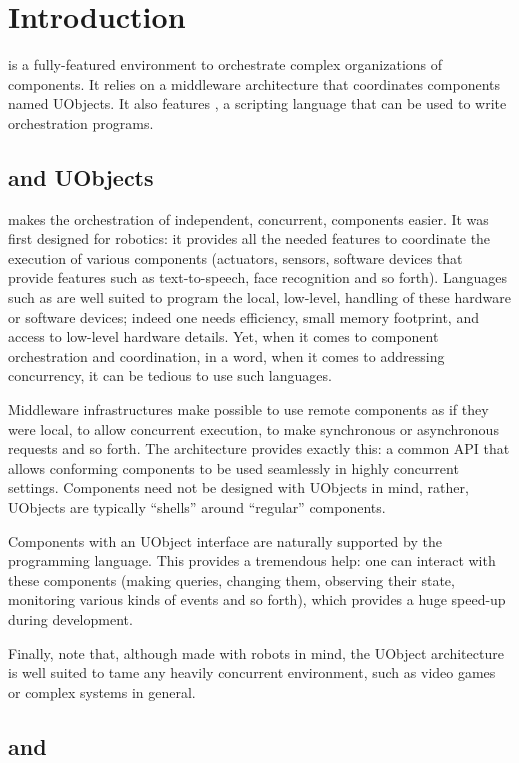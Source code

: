 \chapter{Introduction}

\usdk is a fully-featured environment to orchestrate complex
organizations of components.  It relies on a middleware architecture
that coordinates components named UObjects.  It also features \us, a
scripting language that can be used to write orchestration programs.

\section{\urbi and UObjects}

\urbi makes the orchestration of independent, concurrent, components
easier.  It was first designed for robotics: it provides all the
needed features to coordinate the execution of various components
(actuators, sensors, software devices that provide features such as
text-to-speech, face recognition and so forth).  Languages such as
\Cxx are well suited to program the local, low-level, handling of
these hardware or software devices; indeed one needs efficiency, small
memory footprint, and access to low-level hardware details.  Yet, when
it comes to component orchestration and coordination, in a word, when
it comes to addressing concurrency, it can be tedious to use such
languages.

Middleware infrastructures make possible to use remote components as
if they were local, to allow concurrent execution, to make synchronous
or asynchronous requests and so forth.  The  \Cxx
architecture provides exactly this: a common API that allows
conforming components to be used seamlessly in highly concurrent
settings.  Components need not be designed with UObjects in mind,
rather, UObjects are typically ``shells'' around ``regular''
components.

Components with an UObject interface are naturally supported by the
\us programming language.  This provides a tremendous help: one can
interact with these components (making queries, changing them,
observing their state, monitoring various kinds of events and so
forth), which provides a huge speed-up during development.

Finally, note that, although made with robots in mind, the UObject
architecture is well suited to tame any heavily concurrent
environment, such as video games or complex systems in general.

\section{\urbi and \us}

